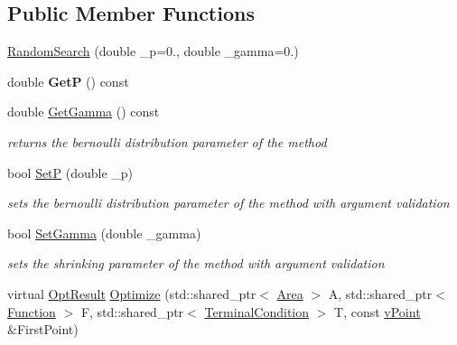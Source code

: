 \subsection*{Public Member Functions}
\begin{DoxyCompactItemize}
\item 
\hyperlink{class_random_search_a92e55b6d0dee76ebbae1c03685c25499}{Random\+Search} (double \+\_\+p=0., double \+\_\+gamma=0.)
\item 
\mbox{\label{class_random_search_a32308c3507abcf02bc0f7da0c53b5ab6}} 
double {\bfseries GetP} () const
\item 
double \hyperlink{class_random_search_a4009e36c2e604791a3f050280262fcc6}{Get\+Gamma} () const
\begin{DoxyCompactList}\small\item\em returns the bernoulli distribution parameter of the method \end{DoxyCompactList}\item 
\mbox{\label{class_random_search_a1aef08ec9c0eb451d0c3350c99285506}} 
bool \hyperlink{class_random_search_a1aef08ec9c0eb451d0c3350c99285506}{SetP} (double \+\_\+p)
\begin{DoxyCompactList}\small\item\em sets the bernoulli distribution parameter of the method with argument validation \end{DoxyCompactList}\item 
\mbox{\label{class_random_search_ad092544a0368d64432128842c365ed44}} 
bool \hyperlink{class_random_search_ad092544a0368d64432128842c365ed44}{Set\+Gamma} (double \+\_\+gamma)
\begin{DoxyCompactList}\small\item\em sets the shrinking parameter of the method with argument validation \end{DoxyCompactList}\item 
virtual \hyperlink{struct_opt_result}{Opt\+Result} \hyperlink{class_random_search_a869069d90b1c12ec67182f415be7e8ce}{Optimize} (std\+::shared\+\_\+ptr$<$ \hyperlink{class_area}{Area} $>$ A, std\+::shared\+\_\+ptr$<$ \hyperlink{class_function}{Function} $>$ F, std\+::shared\+\_\+ptr$<$ \hyperlink{class_terminal_condition}{Terminal\+Condition} $>$ T, const \hyperlink{classv_point}{v\+Point} \&First\+Point)
\item 

\end{DoxyCompactItemize}
